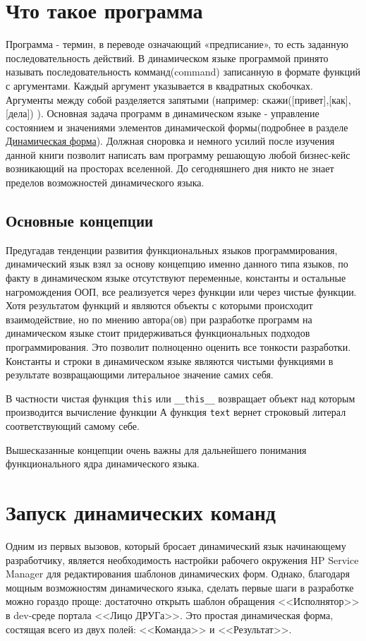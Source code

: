 \documentclass[../index.tex]{subfiles}
\begin{document}
\section{Что такое программа}
    Программа - термин, в переводе означающий «предписание», то есть заданную последовательность действий. В динамическом языке программой принято называть последовательность комманд(\gls{command}) записанную в формате функций с аргументами.
    Каждый аргумент указывается в квадратных скобочках. Аргументы между собой разделяется запятыми (например: скажи([привет],[как],[дела]) ). Основная задача программ в динамическом языке - управление состоянием и значениями элементов динамической формы(подробнее в разделе \hyperref[sec:dynfom]{Динамическая форма}).
    Должная сноровка и немного усилий после изучения данной книги позволит написать вам программу решающую любой бизнес-кейс возникающий на просторах вселенной. До сегодняшнего дня никто не знает пределов возможностей динамического языка.

    \subsection{Основные концепции}
        Предугадав тенденции развития функциональных языков программирования, динамический язык взял за основу концепцию именно данного типа языков, по факту в динамическом языке отсутствуют переменные, константы и остальные нагромождения ООП, все реализуется через функции или через чистые функции. Хотя результатом функций и являются объекты с которыми происходит взаимодействие, но по мнению автора(ов) при разработке программ на динамическом языке стоит придерживаться функциональных подходов программирования. Это позволит полноценно оценить все тонкости разработки.
        Константы и строки в динамическом языке являются чистыми функциями в результате возвращающими литеральное значение самих себя.
                
        В частности чистая функция \texttt{this} или 
        \texttt{\_\_this\_\_} возвращает объект над которым производится вычисление функции
        А функция \texttt{text} вернет строковый литерал соответствующий самому себе.
        
        Вышесказанные концепции очень важны для дальнейшего понимания функционального ядра динамического языка.

	\section{Запуск динамических команд}
	Одним из первых вызовов, который бросает динамический язык начинающему разработчику, является необходимость настройки рабочего окружения HP Service Manager для редактирования шаблонов динамических форм. Однако, благодаря мощным возможностям динамического языка, сделать первые шаги в разработке можно гораздо проще: достаточно открыть шаблон обращения <<Исполнятор>> в dev-среде портала <<Лицо ДРУГа>>. Это простая динамическая форма, состящая всего из двух полей: <<Команда>> и <<Результат>>.
	
\end{document}
